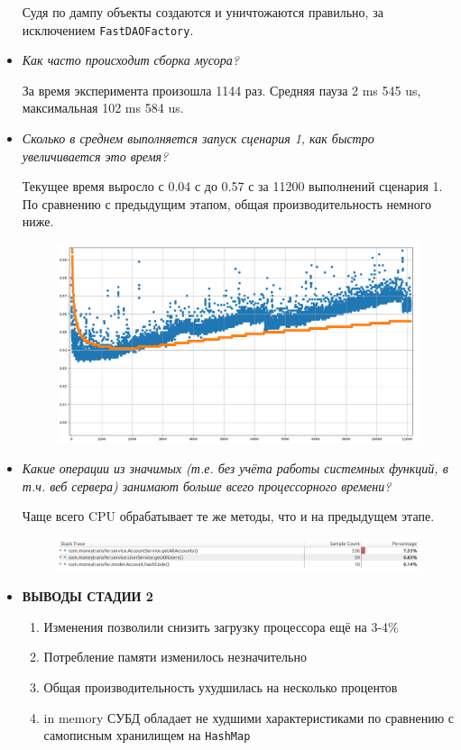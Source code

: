 \documentclass{article}
\begin{document}
\begin{itemize}
	Судя по дампу объекты создаются и уничтожаются правильно, за исключением \texttt{FastDAOFactory}.
	
	\item \textit{Как часто происходит сборка мусора?}
	
	За время эксперимента произошла 1144 раз. Средняя пауза 2 ms 545 us, максимальная 102 ms 584 us. 
	
	\item \textit{Сколько в среднем выполняется запуск сценария 1, как быстро увеличивается это время?}
	
	Текущее время выросло с 0.04 с до  0.57 с за 11200 выполнений сценария 1. 
	По сравнению с предыдущим этапом, общая производительность немного ниже.
	
	\begin{figure}[h!] %
		\centering
		\includegraphics[width=0.95\linewidth]{img/stage_2/pyplot.png}
		\label{fig:pyplot2}
	\end{figure}
	
	\newpage
	\item \textit{Какие операции из значимых (т.е. без учёта работы системных функций, в т.ч. веб сервера) занимают больше всего процессорного времени?}
	
	Чаще всего CPU обрабатывает те же методы, что и на предыдущем этапе.
	
	\begin{figure}[h!] %
		\centering
		\includegraphics[width=0.95\linewidth]{img/stage_2/hotmethods.png}
		\label{fig:hotmethods2}
	\end{figure}
	
	\item \textbf{ВЫВОДЫ СТАДИИ 2}
	\begin{enumerate}
		\item Изменения позволили снизить загрузку процессора ещё на 3-4\%
		\item Потребление памяти изменилось незначительно
		\item Общая производительность ухудшилась на несколько процентов
		\item in memory СУБД обладает не худшими характеристиками по сравнению с самописным хранилищем на \texttt{HashMap}   
	\end{enumerate}
\end{itemize}
\end{document}
